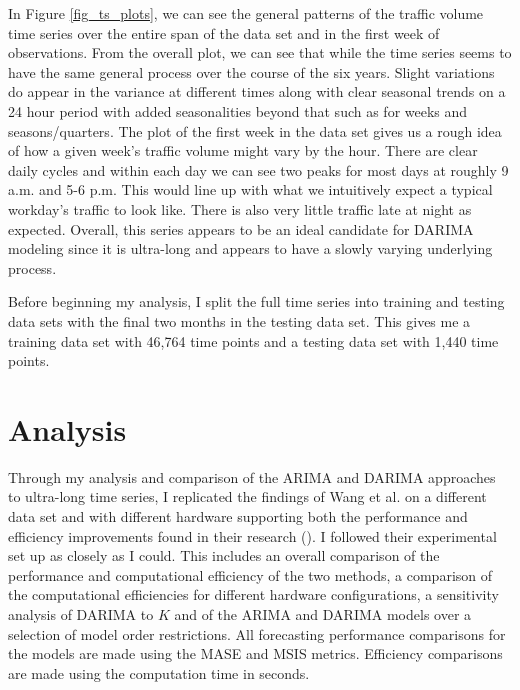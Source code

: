 \documentclass[
]{article}
\begin{document}
In Figure \ref{fig_ts_plots}, we can see the general patterns of the traffic volume time series over the entire span of the data set and in the first week of observations. From the overall plot, we can see that while the time series seems to have the same general process over the course of the six years. Slight variations do appear in the variance at different times along with clear seasonal trends on a 24 hour period with added seasonalities beyond that such as for weeks and seasons/quarters. The plot of the first week in the data set gives us a rough idea of how a given week's traffic volume might vary by the hour. There are clear daily cycles and within each day we can see two peaks for most days at roughly 9 a.m. and 5-6 p.m. This would line up with what we intuitively expect a typical workday's traffic to look like. There is also very little traffic late at night as expected. Overall, this series appears to be an ideal candidate for DARIMA modeling since it is ultra-long and appears to have a slowly varying underlying process.

Before beginning my analysis, I split the full time series into training and testing data sets with the final two months in the testing data set. This gives me a training data set with 46,764 time points and a testing data set with 1,440 time points. 

\section*{Analysis}

Through my analysis and comparison of the ARIMA and DARIMA approaches to ultra-long time series, I replicated the findings of Wang et al. on a different data set and with different hardware supporting both the performance and efficiency improvements found in their research (\cite*[p.21-31]{wang_distributed_2020}). I followed their experimental set up as closely as I could. This includes an overall comparison of the performance and computational efficiency of the two methods, a comparison of the computational efficiencies for different hardware configurations, a sensitivity analysis of DARIMA to $K$ and of the ARIMA and DARIMA models over a selection of model order restrictions. All forecasting performance comparisons for the models are made using the MASE and MSIS metrics. Efficiency comparisons are made using the computation time in seconds. 
\end{document}
